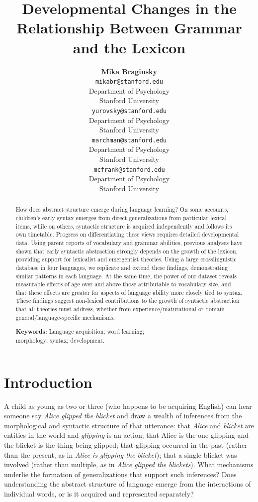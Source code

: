 \documentclass[10pt,letterpaper]{article}
\title{Developmental Changes in the Relationship Between Grammar and the Lexicon}
\author{{\large \bf Mika Braginsky} \\
  \texttt{mikabr@stanford.edu} \\
  Department of Psychology \\
  Stanford University
  \And {\large \bf Daniel Yurovsky} \\
  \texttt{yurovsky@stanford.edu} \\
  Department of Psychology \\
  Stanford University
    \And {\large \bf Virginia A. Marchman} \\
    \texttt{marchman@stanford.edu} \\
  Department of Psychology \\
  Stanford University
    \And {\large \bf Michael C. Frank}\\
    \texttt{mcfrank@stanford.edu} \\
  Department of Psychology \\
  Stanford University}
\begin{document}
\maketitle

\begin{abstract}

How does abstract structure emerge during language learning? On some accounts, children's early syntax emerges from direct generalizations from particular lexical items, while on others, syntactic structure is acquired independently and follows its own timetable. Progress on differentiating these views requires detailed developmental data. Using parent reports of vocabulary and grammar abilities, previous analyses have shown that early syntactic abstraction strongly depends on the growth of the lexicon, providing support for lexicalist and emergentist theories. Using a large crosslinguistic database in four languages, we replicate and extend these findings, demonstrating similar patterns in each language. At the same time, the power of our dataset reveals measurable effects of age over and above those attributable to vocabulary size, and that these effects are greater for aspects of language ability more closely tied to syntax. These findings suggest non-lexical contributions to the growth of syntactic abstraction that all theories must address, whether from experience/maturational or domain-general/language-specific mechanisms.

\textbf{Keywords:} 
Language acquisition; word learning; \\morphology; syntax; development.
\end{abstract}

\section{Introduction}

A child as young as two or three (who happens to be acquiring English) can hear someone say \emph{Alice glipped the blicket} and draw a wealth of inferences from the morphological and syntactic structure of that utterance: that \emph{Alice} and \emph{blicket} are entities in the world and \emph{glipping} is an action; that Alice is the one glipping and the blicket is the thing being glipped; that glipping occurred in the past (rather than the present, as in \emph{Alice is glipping the blicket}); that a single blicket was involved (rather than multiple, as in \emph{Alice glipped the blickets}). What mechanisms underlie the formation of generalizations that support such inferences? Does understanding the abstract structure of language emerge from the interactions of individual words, or is it acquired and represented separately?
\end{document}
